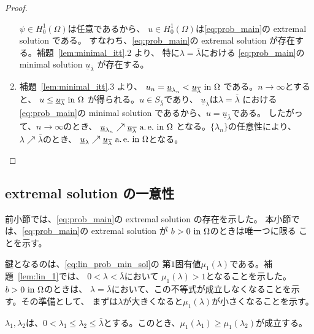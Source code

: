 \begin{proof}
\begin{enumerate}[1.]
        $\psi \in H_0^1(\Omega)$は任意であるから、
        $u \in H_0^1(\Omega)$は\ref{eq:prob_main}の extremal solution
        である。
        すなわち、\ref{eq:prob_main}の extremal solution
        が存在する。補題~\ref{lem:minimal_itt}.2 より、
        特に$\lambda = \bar{\lambda}$における
        \ref{eq:prob_main}の minimal solution 
        $\underline{u}_{\bar{\lambda}}$
        が存在する。
  \item 補題~\ref{lem:minimal_itt}.3 より、
        $u_n = \underline{u}_{\lambda_n} <
        \underline{u}_{\overline{\lambda}} ~\text{in}~ \Omega$
        である。$n \to \infty$とすると、
        $u \leq \underline{u}_{\overline{\lambda}} ~\text{in}~ \Omega$
        が得られる。$u \in S_{\bar{\lambda}}$であり、
        $\underline{u}_{\bar{\lambda}}$は$\lambda = \bar{\lambda}$
        における \ref{eq:prob_main}の minimal solution 
        であるから、$u = \underline{u}_{\bar{\lambda}}$である。
        したがって、$n \to \infty$のとき、
        $\underline{u}_{\lambda_n} \nearrow
        \underline{u}_{\overline{\lambda}} ~\text{a.\,e.}~ \text{in}~ \Omega$
        となる。$\{ \lambda_n \}$の任意性により、
        $\lambda \nearrow \bar{\lambda}$のとき、
        $\underline{u}_{\lambda} \nearrow
        \underline{u}_{\overline{\lambda}} ~\text{a.\,e.}~ \text{in}~ \Omega$となる。\qedhere
 \end{enumerate}
\end{proof}

\subsection{extremal solution の一意性}

前小節では、\ref{eq:prob_main}の extremal solution の存在を示した。
本小節では、\ref{eq:prob_main}の extremal solution が
$b > 0 ~\text{in}~ \Omega$のときは唯一つに限る
ことを示す。

鍵となるのは、\eqref{eq:lin_prob_min_sol}の
第$1$固有値$\mu_1(\lambda)$である。補題~\ref{lem:lin_1}では、
$0 < \lambda < \bar{\lambda}$において
$\mu_1(\lambda) > 1$となることを示した。
$b > 0 ~\text{in}~ \Omega$のときは、
$\lambda = \bar{\lambda}$において、この不等式が成立しなくなることを示
す。その準備として、
まずは$\lambda$が大きくなると$\mu_1(\lambda)$が小さくなることを示す。

\begin{lem} \label{rem:mu1_dec}
 $\lambda_1, \lambda_2$は、$0 < \lambda_1 \leq \lambda_2 \leq
 \bar{\lambda}$とする。このとき、$\mu_1(\lambda_1) \geq
 \mu_1(\lambda_2)$が成立する。
\end{lem}

